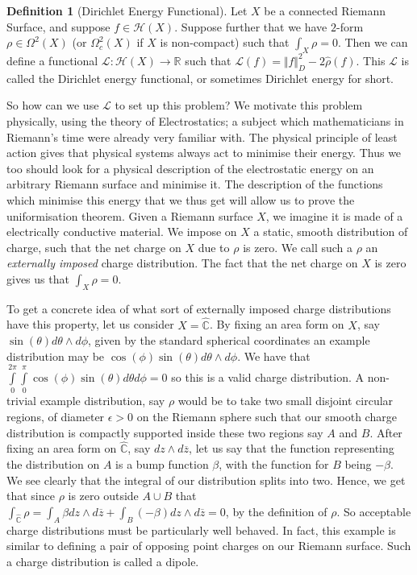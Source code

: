 \documentclass[11pt]{report}
\theoremstyle{definition}
\newtheorem{defn}[thm]{Definition}
\begin{document}
\begin{defn}[Dirichlet Energy Functional]
  Let $X$ be a connected Riemann Surface, and suppose $f \in \mathcal{H}(X)$. Suppose further that we have $2$-form $\rho \in \Omega^2 (X)$ (or $\Omega^2_c (X)$ if $X$ is non-compact) such that $\int_X \rho = 0$. Then we can define a functional $\mathcal{L}: \mathcal{H}(X) \rightarrow \mathbb{R}$ such that $\mathcal{L}(f) = \Vert f\Vert ^2_D - 2\hat{\rho}(f)$. This $\mathcal{L}$ is called the Dirichlet energy functional, or sometimes Dirichlet energy for short.
\end{defn}
So how can we use $\mathcal{L}$ to set up this problem? We motivate this problem physically, using the theory of Electrostatics; a subject which mathematicians in Riemann's time were already very familiar with. The physical principle of least action gives that physical systems always act to minimise their energy. Thus we too should look for a physical description of the electrostatic energy on an arbitrary Riemann surface and minimise it. The description of the functions which minimise this energy that we thus get will allow us to prove the uniformisation theorem. Given a Riemann surface $X$, we imagine it is made of a electrically conductive material. We impose on $X$ a static, smooth distribution of charge, such that the net charge on $X$ due to $\rho$ is zero. We call such a $\rho$ an \emph{externally imposed} charge distribution. The fact that the net charge on $X$ is zero gives us that $\int_X \rho = 0$. 

To get a concrete idea of what sort of externally imposed charge distributions have this property, let us consider $X=\widehat{\mathbb{C}}$. By fixing an area form on $X$, say $\sin(\theta) d\theta\wedge d\phi$, given by the standard spherical coordinates an example distribution may be $\cos(\phi)\sin(\theta)d\theta\wedge d\phi$. We have that $\int\limits_0^{2\pi}\int\limits_0^{\pi} \cos(\phi)\sin(\theta)d\theta d\phi = 0$ so this is a valid charge distribution. A non-trivial example distribution, say $\rho$ would be to take two small disjoint circular regions, of diameter $\epsilon > 0$ on the Riemann sphere such that our smooth charge distribution is compactly supported inside these two regions say $A$ and $B$. After fixing an area form on $\widehat{\mathbb{C}}$, say $dz \wedge d\overline{z}$, let us say that the function representing the distribution on $A$ is a bump function $\beta$, with the function for $B$ being $-\beta$. We see clearly that the integral of our distribution splits into two. Hence, we get that since $\rho$ is zero outside $A \cup B$ that $\int_{\widehat{\mathbb{C}}} \rho = \int_A \beta dz\wedge d\overline{z} + \int_B (-\beta) dz\wedge d\overline{z} = 0$, by the definition of $\rho$. So acceptable charge distributions must be particularly well behaved. In fact, this example is similar to defining a pair of opposing point charges on our Riemann surface. Such a charge distribution is called a dipole. 
\end{document}
